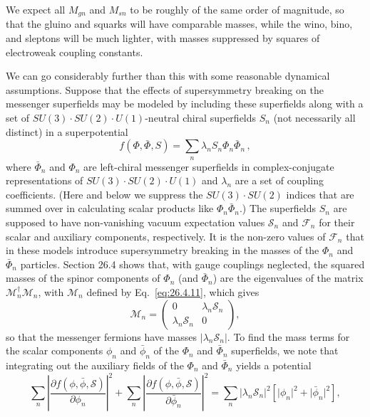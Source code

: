 We expect all \(M_{gn}\) and \(M_{sn}\) to be roughly of the same order of
magnitude, so that the gluino and squarks will have comparable masses,
while the wino, bino, and sleptons will be much lighter, with masses
suppressed by squares of electroweak coupling constants.

We can go considerably further than this with some reasonable dynamical
assumptions. Suppose that the effects of supersymmetry breaking on the
messenger superfields may be modeled by including these superfields along
with a set of
\(SU(3)\mathbin{\cdot}SU(2)\mathbin{\cdot}U(1)\)-neutral chiral
superfields \(S_n\) (not necessarily all distinct) in a superpotential
\begin{equation}
  f(\Phi,\bar\Phi,S)=\sum_n\lambda_nS_n\Phi_n\bar\Phi_n\,,
  \tag{28.6.5}\label{eq:28.6.5}
\end{equation}
where \(\bar\Phi_n\) and \(\Phi_n\) are left-chiral messenger superfields
in complex-conjugate representations of
\(SU(3)\mathbin{\cdot}SU(2)\mathbin{\cdot}U(1)\) and \(\lambda_n\) are a
set of coupling coefficients. (Here and below we suppress the
\(SU(3)\mathbin{\cdot}SU(2)\) indices that are summed over in calculating
scalar products like \(\Phi_n\bar\Phi_n\).) The superfields \(S_n\) are
supposed to have non-vanishing vacuum expectation values
\(\mathcal{S}_n\) and \(\mathcal{F}_n\) for their scalar and auxiliary
components, respectively. It is the non-zero values of \(\mathcal{F}_n\)
that in these models introduce supersymmetry breaking in the masses of the
\(\Phi_n\) and \(\bar\Phi_n\) particles. Section 26.4 shows that, with
gauge couplings neglected, the squared masses of the spinor components of
\(\Phi_n\) (and \(\bar\Phi_n\)) are the eigenvalues of the matrix
\(\mathcal{M}_n^\dagger\mathcal{M}_n\), with \(\mathcal{M}_n\) defined by
Eq.~\eqref{eq:26.4.11}, which gives
\[
  \mathcal{M}_n=
  \begin{pmatrix}
    0&\lambda_n\mathcal{S}_n\\
    \lambda_n\mathcal{S}_n&0
  \end{pmatrix},
\]
so that the messenger fermions have masses
\(\lvert\lambda_n\mathcal{S}_n\rvert\). To find the mass terms for the
scalar components \(\phi_n\) and \(\bar\phi_n\) of the \(\Phi_n\) and
\(\bar\Phi_n\) superfields, we note that integrating out the auxiliary
fields of the \(\Phi_n\) and \(\bar\Phi_n\) yields a potential
\[
  \sum_n\left|
    \frac{\partial f(\phi,\bar\phi,\mathcal{S})}{\partial\phi_n}
  \right|^2
  +\sum_n\left|
    \frac{\partial f(\phi,\bar\phi,\mathcal{S})}{\partial\bar\phi_n}
  \right|^2
  =\sum_n\lvert\lambda_n\mathcal{S}_n\rvert^2
    \left[\lvert\phi_n\rvert^2+\lvert\bar\phi_n\rvert^2\right],
\]
